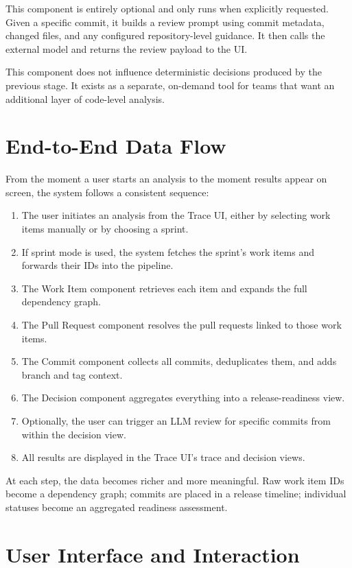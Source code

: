 This component is entirely optional and only runs when explicitly requested. Given a specific commit, it builds a review prompt using commit metadata, changed files, and any configured repository-level guidance. It then calls the external model and returns the review payload to the UI.

This component does not influence deterministic decisions produced by the previous stage. It exists as a separate, on-demand tool for teams that want an additional layer of code-level analysis.

\section{End-to-End Data Flow}
\label{sec:data-flow}

From the moment a user starts an analysis to the moment results appear on screen, the system follows a consistent sequence:

\begin{enumerate}
    \item The user initiates an analysis from the Trace UI, either by selecting work items manually or by choosing a sprint.
    \item If sprint mode is used, the system fetches the sprint's work items and forwards their IDs into the pipeline.
    \item The Work Item component retrieves each item and expands the full dependency graph.
    \item The Pull Request component resolves the pull requests linked to those work items.
    \item The Commit component collects all commits, deduplicates them, and adds branch and tag context.
    \item The Decision component aggregates everything into a release-readiness view.
    \item Optionally, the user can trigger an LLM review for specific commits from within the decision view.
    \item All results are displayed in the Trace UI's trace and decision views.
\end{enumerate}

At each step, the data becomes richer and more meaningful. Raw work item IDs become a dependency graph; commits are placed in a release timeline; individual statuses become an aggregated readiness assessment.

\section{User Interface and Interaction}

